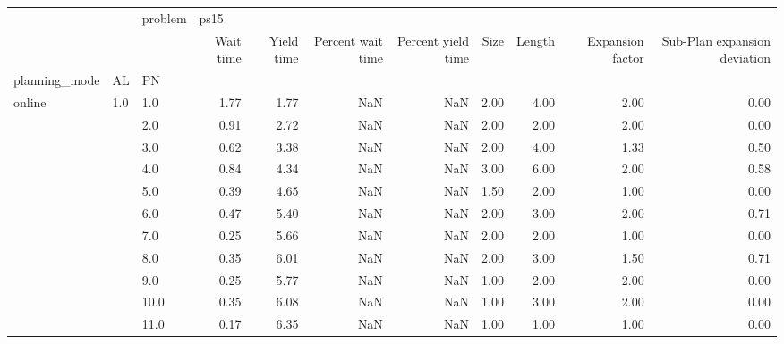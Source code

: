 \begin{tabular}{lllrrrrrrrr}
\toprule
       &     & problem & \multicolumn{8}{l}{ps15} \\
       &     & {} & Wait time & Yield time & Percent wait time & Percent yield time & Size & Length & Expansion factor & Sub-Plan expansion deviation \\
planning\_mode & AL & PN &           &            &                   &                    &      &        &                  &                              \\
\midrule
online & 1.0 & 1.0  &      1.77 &       1.77 &               NaN &                NaN & 2.00 &   4.00 &             2.00 &                         0.00 \\
       &     & 2.0  &      0.91 &       2.72 &               NaN &                NaN & 2.00 &   2.00 &             2.00 &                         0.00 \\
       &     & 3.0  &      0.62 &       3.38 &               NaN &                NaN & 2.00 &   4.00 &             1.33 &                         0.50 \\
       &     & 4.0  &      0.84 &       4.34 &               NaN &                NaN & 3.00 &   6.00 &             2.00 &                         0.58 \\
       &     & 5.0  &      0.39 &       4.65 &               NaN &                NaN & 1.50 &   2.00 &             1.00 &                         0.00 \\
       &     & 6.0  &      0.47 &       5.40 &               NaN &                NaN & 2.00 &   3.00 &             2.00 &                         0.71 \\
       &     & 7.0  &      0.25 &       5.66 &               NaN &                NaN & 2.00 &   2.00 &             1.00 &                         0.00 \\
       &     & 8.0  &      0.35 &       6.01 &               NaN &                NaN & 2.00 &   3.00 &             1.50 &                         0.71 \\
       &     & 9.0  &      0.25 &       5.77 &               NaN &                NaN & 1.00 &   2.00 &             2.00 &                         0.00 \\
       &     & 10.0 &      0.35 &       6.08 &               NaN &                NaN & 1.00 &   3.00 &             2.00 &                         0.00 \\
       &     & 11.0 &      0.17 &       6.35 &               NaN &                NaN & 1.00 &   1.00 &             1.00 &                         0.00 \\

\end{tabular}
